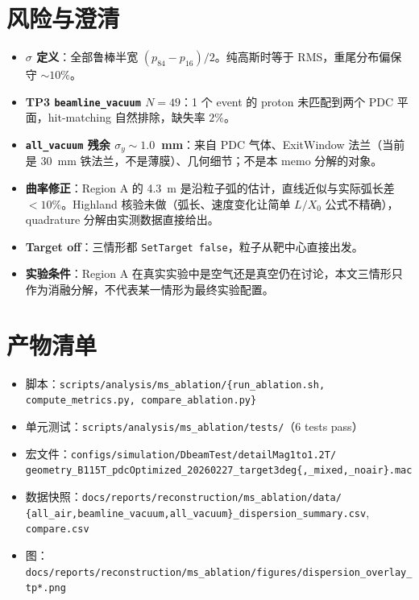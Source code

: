 \documentclass[a4paper, 11pt]{article}
\begin{document}
\section{风险与澄清}

\begin{itemize}[nosep]
  \item \textbf{$\sigma$ 定义}：全部鲁棒半宽 $(p_{84}-p_{16})/2$。纯高斯时等于 RMS，重尾分布偏保守 $\sim 10\%$。
  \item \textbf{TP3 \texttt{beamline\_vacuum} $N=49$}：1 个 event 的 proton 未匹配到两个 PDC 平面，hit-matching 自然排除，缺失率 $2\%$。
  \item \textbf{\texttt{all\_vacuum} 残余 $\sigma_y \sim 1.0$~mm}：来自 PDC 气体、ExitWindow 法兰（当前是 $30$~mm 铁法兰，不是薄膜）、几何细节；不是本 memo 分解的对象。
  \item \textbf{曲率修正}：Region A 的 4.3~m 是沿粒子弧的估计，直线近似与实际弧长差 $<10\%$。Highland 核验未做（弧长、速度变化让简单 $L/X_0$ 公式不精确），quadrature 分解由实测数据直接给出。
  \item \textbf{Target off}：三情形都 \texttt{SetTarget false}，粒子从靶中心直接出发。
  \item \textbf{实验条件}：Region A 在真实实验中是空气还是真空仍在讨论，本文三情形只作为消融分解，不代表某一情形为最终实验配置。
\end{itemize}

\section{产物清单}

\begin{itemize}[nosep]
  \item 脚本：\verb|scripts/analysis/ms_ablation/{run_ablation.sh, compute_metrics.py, compare_ablation.py}|
  \item 单元测试：\verb|scripts/analysis/ms_ablation/tests/|（6 tests pass）
  \item 宏文件：\verb|configs/simulation/DbeamTest/detailMag1to1.2T/|\\
        \verb|geometry_B115T_pdcOptimized_20260227_target3deg{,_mixed,_noair}.mac|
  \item 数据快照：\verb|docs/reports/reconstruction/ms_ablation/data/|\\
        \verb|{all_air,beamline_vacuum,all_vacuum}_dispersion_summary.csv|, \verb|compare.csv|
  \item 图：\verb|docs/reports/reconstruction/ms_ablation/figures/dispersion_overlay_tp*.png|
\end{itemize}
\end{document}
